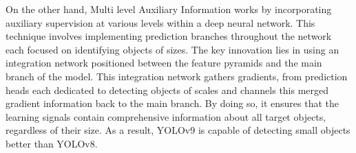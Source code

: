 
On the other hand, Multi level Auxiliary Information works by incorporating auxiliary supervision at various levels within a deep neural network. This technique involves implementing prediction branches throughout the network each focused on identifying objects of sizes. The key innovation lies in using an integration network positioned between the feature pyramids and the main branch of the model. This integration network gathers gradients, from prediction heads each dedicated to detecting objects of scales and channels this merged gradient information back to the main branch. By doing so, it ensures that the learning signals contain comprehensive information about all target objects, regardless of their size. As a result, YOLOv9 is capable of detecting small objects better than YOLOv8.





